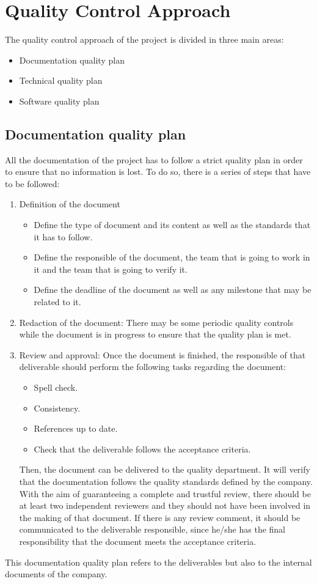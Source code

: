 \section{Quality Control Approach}

The quality control approach of the project is divided in three main areas:
\begin{itemize}
	\item Documentation quality plan
	\item Technical quality plan
	\item Software quality plan
\end{itemize}

\subsection{Documentation quality plan}
All the documentation of the project has to follow a strict quality plan in order to ensure that no information is lost. To do so, there is a series of steps that have to be followed:
\begin{enumerate}
	\item Definition of the document
	\begin{itemize}
		\item Define the type of document and its content as well as the standards that it has to follow.
		\item Define the responsible of the document, the team that is going to work in it and the team that is going to verify it.
		\item Define the deadline of the document as well as any milestone that may be related to it.
	\end{itemize}
	\item Redaction of the document: There may be some periodic quality controls while the document is in progress to ensure that the quality plan is met.
	\item Review and approval: Once the document is finished, the responsible of that deliverable should perform the following tasks regarding the document:
	\begin{itemize}
		\item Spell check.
		\item Consistency.
		\item References up to date.
		\item Check that the deliverable follows the acceptance criteria.
	\end{itemize}
	Then, the document can be delivered to the quality department. It will verify that the documentation follows the quality standards defined by the company. With the aim of guaranteeing a complete and trustful review, there should be at least two independent reviewers and they should not have been involved in the making of that document.
	If there is any review comment, it should be communicated to the deliverable responsible, since he/she has the final responsibility that the document meets the acceptance criteria.
\end{enumerate}
This documentation quality plan refers to the deliverables but also to the internal documents of the company.

